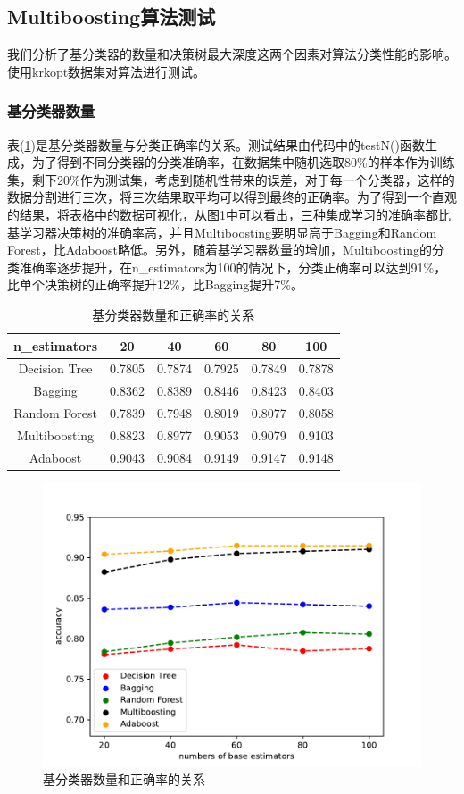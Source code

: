 \documentclass[a4paper,oneside,12pt]{article}
\begin{document}
\begin{spacing}{1.5}
\subsection{Multiboosting算法测试}
我们分析了基分类器的数量和决策树最大深度这两个因素对算法分类性能的影响。使用krkopt数据集对算法进行测试。
\subsubsection{基分类器数量}
表(\ref{tab5})是基分类器数量与分类正确率的关系。测试结果由代码中的testN()函数生成，为了得到不同分类器的分类准确率，在数据集中随机选取80\%的样本作为训练集，剩下20\%作为测试集，考虑到随机性带来的误差，对于每一个分类器，这样的数据分割进行三次，将三次结果取平均可以得到最终的正确率。为了得到一个直观的结果，将表格中的数据可视化，从图\ref{fig1}中可以看出，三种集成学习的准确率都比基学习器决策树的准确率高，并且Multiboosting要明显高于Bagging和Random Forest，比Adaboost略低。另外，随着基学习器数量的增加，Multiboosting的分类准确率逐步提升，在n\_estimators为100的情况下，分类正确率可以达到91\%，比单个决策树的正确率提升12\%，比Bagging提升7\%。

\begin{table}[htbp]
 \caption{\label{tab5}基分类器数量和正确率的关系}
 \center
 \begin{tabular}{cccccc}
  \toprule
   n\_estimators &20 &40 & 60 & 80 & 100  \\
  \midrule
 Decision Tree & 0.7805 & 0.7874 & 0.7925 & 0.7849 & 0.7878 \\
 Bagging & 0.8362 & 0.8389 & 0.8446 & 0.8423 & 0.8403 \\
 Random Forest & 0.7839 & 0.7948 & 0.8019 & 0.8077 & 0.8058 \\
 Multiboosting & 0.8823 & 0.8977 & 0.9053 & 0.9079 & 0.9103 \\
 Adaboost & 0.9043 & 0.9084 & 0.9149 & 0.9147 & 0.9148 \\
  \bottomrule
 \end{tabular}
\end{table}
\begin{figure}
  \centering
  \includegraphics[width=4 in]{fig1.pdf}
  \caption{基分类器数量和正确率的关系}\label{fig1}
\end{figure}

\end{spacing}
\end{document}

